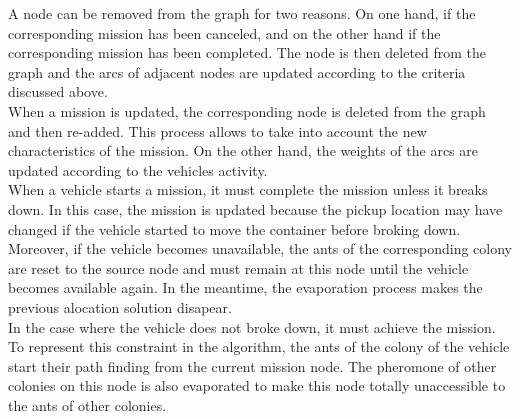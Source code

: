 \documentclass[a4paper,10pt]{article}
\begin{document}
A node can be removed from the graph for two reasons. On one hand, if the corresponding mission has been canceled, and on the other hand if the corresponding mission has been completed. The node is then deleted from the graph and the arcs of adjacent nodes are updated according to the criteria discussed above.
\\

When a mission is updated, the corresponding node is deleted from the graph and then re-added. This process allows to take into account the new characteristics of the mission. On the other hand, the weights of the arcs are updated according to the vehicles activity.
\\

When a vehicle starts a mission, it must complete the mission unless it breaks down. In this case, the mission is updated because the pickup location may have changed if the vehicle started to move the container before broking down. Moreover, if the vehicle becomes unavailable, the ants of the corresponding colony are reset to the source node and must remain at this node until the vehicle becomes available again. In the meantime, the evaporation process makes the previous alocation solution disapear.\\

In the case where the vehicle does not broke down, it must achieve the mission. To represent this constraint in the algorithm, the ants of the colony of the vehicle start their path finding from the current mission node. The pheromone of other colonies on this node is also evaporated to make this node totally unaccessible to the ants of other colonies.
\end{document}

